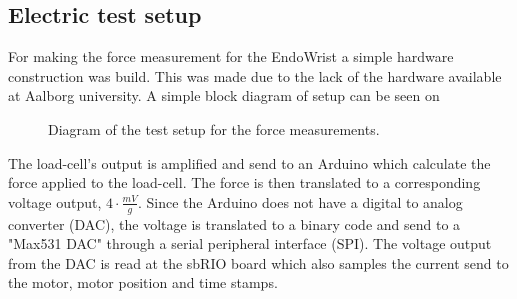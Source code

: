 \subsection*{Electric test setup}
For making the force measurement for the EndoWrist a simple hardware construction was build. This was made due to the lack of the hardware available at Aalborg university. A simple block diagram of setup can be seen on 

\begin{figure}[H]
\centering
{}
\caption{Diagram of the test setup for the force measurements.}
\label{fig:arduino_loadcell}
\end{figure}
The load-cell's output is amplified and send to an Arduino which calculate the force applied to the load-cell. The force is then translated to a corresponding voltage output, $4\cdot\frac{mV}{g}$. Since the Arduino does not have a digital to analog converter (DAC), the voltage is translated to a binary code and send to a "Max531 DAC" through a serial peripheral interface (SPI). The voltage output from the DAC is read at the sbRIO board which also samples the current send to the motor, motor position and time stamps.



